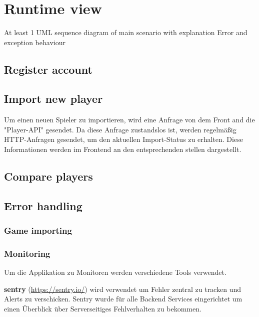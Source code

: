 \section{Runtime view}
At least 1 UML sequence diagram of main scenario with explanation
Error and exception behaviour
\subsection{Register account}

\subsection{Import new player}

Um einen neuen Spieler zu importieren, wird eine Anfrage von dem Front and die "Player-API" gesendet. Da diese Anfrage zustandslos ist, werden regelmäßig HTTP-Anfragen gesendet, um den aktuellen Import-Status 
zu erhalten. Diese Informationen werden im Frontend an den entsprechenden stellen dargestellt.


\subsection{Compare players}

\subsection{Error handling}
\subsubsection{Game importing}
\subsubsection{Monitoring}

Um die Applikation zu Monitoren werden verschiedene Tools verwendet.

\textbf{sentry} (\href{https://sentry.io/}{https://sentry.io/}) wird verwendet um Fehler zentral zu tracken und
Alerts zu verschicken.
Sentry wurde für alle Backend Services eingerichtet um einen Überblick über Serverseitiges Fehlverhalten zu bekommen.

